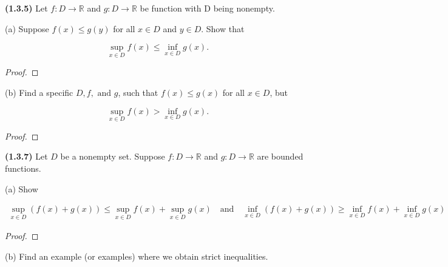 \documentclass[12pt]{article}
\newcommand{\bR}{{\mathbb{R}}}
\begin{document}
\newpage

\noindent \textbf{(1.3.5)} Let $f : D\to \bR$ and $g : D\to \bR$ be function with D being nonempty. \newline

\noindent (a) Suppose $f(x)\le g(y)$ for all $x\in D$ and $y\in D$. Show that

\begin{equation*}
	\underset{x\in D}{\sup} f(x) \le \underset{x\in D}{\inf} g(x).
\end{equation*} 

\begin{proof}
	\lipsum[1]
\end{proof}

\newpage

\noindent (b) Find a specific $D, f, \text{ and } g$, such that $f(x) \le g(x)$ for all $x\in D$, but

\begin{equation*}
	\underset{x\in D}{\sup} f(x) > \underset{x\in D}{\inf} g(x).
\end{equation*}

\begin{proof}
	\lipsum[1]
\end{proof}

\newpage

\noindent \textbf{(1.3.7)} Let $D$ be a nonempty set. Suppose $f : D\to\bR$ and $g : D\to \bR$ are bounded functions. \newline

\noindent (a) Show

\begin{align*}
	\underset{x\in D}{\sup}(f(x) + g(x))\le\underset{x\in D}{\sup}f(x) + \underset{x\in D}{\sup}g(x) \quad \text{and} \quad \underset{x\in D}{\inf}(f(x)+g(x))\ge \underset{x\in D}{\inf}f(x) + \underset{x\in D}{\inf}g(x)
\end{align*}

\begin{proof}
	\lipsum[1]
\end{proof}

\noindent (b) Find an example (or examples) where we obtain strict inequalities.
\end{document}
